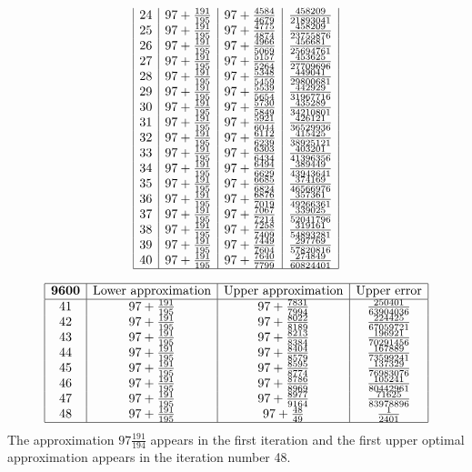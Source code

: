 \documentclass{amsart}
\begin{document}
$$\begin{array}{|c|c|c|c|}
24&97+\frac{191}{195}&97+\frac{4584}{4679}&\frac{458209}{21893041}\\
25&97+\frac{191}{195}&97+\frac{4775}{4874}&\frac{458209}{23755876}\\
26&97+\frac{191}{195}&97+\frac{4966}{5069}&\frac{456681}{25694761}\\
27&97+\frac{191}{195}&97+\frac{5157}{5264}&\frac{453625}{27709696}\\
28&97+\frac{191}{195}&97+\frac{5348}{5459}&\frac{449041}{29800681}\\
29&97+\frac{191}{195}&97+\frac{5539}{5654}&\frac{442929}{31967716}\\
30&97+\frac{191}{195}&97+\frac{5730}{5849}&\frac{435289}{34210801}\\
31&97+\frac{191}{195}&97+\frac{5921}{6044}&\frac{426121}{36529936}\\
32&97+\frac{191}{195}&97+\frac{6112}{6239}&\frac{415425}{38925121}\\
33&97+\frac{191}{195}&97+\frac{6303}{6434}&\frac{403201}{41396356}\\
34&97+\frac{191}{195}&97+\frac{6494}{6629}&\frac{389449}{43943641}\\
35&97+\frac{191}{195}&97+\frac{6685}{6824}&\frac{374169}{46566976}\\
36&97+\frac{191}{195}&97+\frac{6876}{7019}&\frac{357361}{49266361}\\
37&97+\frac{191}{195}&97+\frac{7067}{7214}&\frac{339025}{52041796}\\
38&97+\frac{191}{195}&97+\frac{7258}{7409}&\frac{319161}{54893281}\\
39&97+\frac{191}{195}&97+\frac{7449}{7604}&\frac{297769}{57820816}\\
40&97+\frac{191}{195}&97+\frac{7640}{7799}&\frac{274849}{60824401}\\
\hline
\end{array}$$

\newpage
$$\begin{array}{|c|c|c|c|}
 \hline
 {\bf 9600}&\text{Lower approximation}&\text{Upper approximation}&\text{Upper error}\\
 \hline
41&97+\frac{191}{195}&97+\frac{7831}{7994}&\frac{250401}{63904036}\\
42&97+\frac{191}{195}&97+\frac{8022}{8189}&\frac{224425}{67059721}\\
43&97+\frac{191}{195}&97+\frac{8213}{8384}&\frac{196921}{70291456}\\
44&97+\frac{191}{195}&97+\frac{8404}{8579}&\frac{167889}{73599241}\\
45&97+\frac{191}{195}&97+\frac{8595}{8774}&\frac{137329}{76983076}\\
46&97+\frac{191}{195}&97+\frac{8786}{8969}&\frac{105241}{80442961}\\
47&97+\frac{191}{195}&97+\frac{8977}{9164}&\frac{71625}{83978896}\\
48&97+\frac{191}{195}&97+\frac{48}{49}&\frac{1}{2401}\\
 \hline
\end{array}$$
 The approximation  $97\frac{191}{194}$ appears in the first iteration and the first upper optimal approximation appears in the iteration number 48.
 
\end{document}

